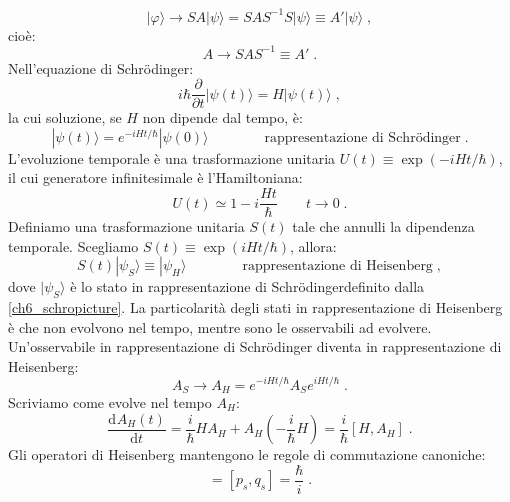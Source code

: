\documentclass[12pt,a4paper]{report}
\theoremstyle{definition}
\newcommand{\dev}[3][]{\frac{\mathrm{d}^{#1} #2}{\mathrm{d} #3^{#1}}}
\numberwithin{equation}{section}
\newcommand{\ket}{\rangle}
\newcommand{\Sch}{Schrödinger}
\begin{document}
$$
|\varphi\ket\to SA|\psi\ket=SAS^{-1}S|\psi\ket\equiv A'|\psi\ket\;,
$$
cioè:
$$
A\to SAS^{-1}\equiv A'\;.
$$
Nell'equazione di \Sch:
\begin{equation}
i\hbar\frac{\partial}{\partial t}|\psi(t)\ket=H|\psi(t)\ket\;,
\end{equation}
la cui soluzione, se $H$ non dipende dal tempo, è:
\begin{equation}
|\psi(t)\ket=e^{-iHt/\hbar}|\psi(0)\ket \qquad\qquad\mbox{rappresentazione di \Sch}\;. \label{ch6_schropicture}
\end{equation}
L'evoluzione temporale è una trasformazione unitaria $U(t)\equiv \exp(-iHt/\hbar)$, il cui generatore infinitesimale è l'Hamiltoniana:
\begin{equation}
U(t)\simeq 1-i\frac{Ht}{\hbar} \qquad t\to 0\;.
\end{equation}
Definiamo una trasformazione unitaria $S(t)$ tale che annulli la dipendenza temporale. Scegliamo $S(t)\equiv \exp(iHt/\hbar)$, allora:
\begin{equation}
S(t)|\psi_S\ket \equiv |\psi_H\ket \qquad\qquad\mbox{rappresentazione di Heisenberg}\;, \label{ch6_heisenpicture}
\end{equation}
dove $|\psi_S\ket$ è lo stato in rappresentazione di \Sch definito dalla \eqref{ch6_schropicture}. La particolarità degli stati in rappresentazione di Heisenberg è che non evolvono nel tempo, mentre sono le osservabili ad evolvere. Un'osservabile in rappresentazione di \Sch\; diventa in rappresentazione di Heisenberg:
\begin{equation}
A_S\to A_H=e^{-iHt/\hbar}A_Se^{iHt/\hbar}\;.
\end{equation}
Scriviamo come evolve nel tempo $A_H$:
\begin{equation}
\dev{A_H(t)}{t}=\frac{i}{\hbar}HA_H+A_H\left(-\frac{i}{\hbar}H\right)=\frac{i}{\hbar}[H,A_H]\;.
\end{equation}
Gli operatori di Heisenberg mantengono le regole di commutazione canoniche:
\begin{equation}
[p_H,q_H]=[p_s,q_s]=\frac{\hbar}{i}\;.
\end{equation}
\end{document}
